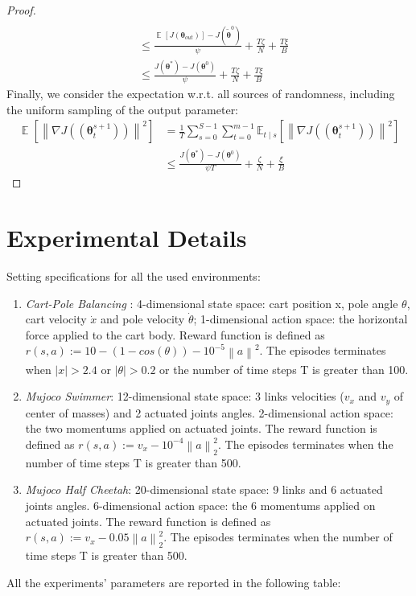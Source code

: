 \documentclass{article}
\makeatletter
\theoremstyle{remark}
\theoremstyle{definition}
\DeclareRobustCommand{\wrt}{w.r.t.\@\xspace}
\DeclareMathOperator*{\EV}{\mathbb{E}}
\newcommand{\EVV}[2][\ppvect \in \ppspace]{\EV_{#1}\left[{#2}\right]}
\newcommand{\norm}[2][\infty]{\left\|#2\right\|_{#1}}
\newcommand{\vtheta}{\boldsymbol{\theta}}
\newcommand{\gradJ}[1]{\nabla J(#1)}
\newcommand{\Ets}[2][t]{\mathbb{E}_{#1\mid s}\left[#2\right]}
\makeatother
\begin{document}
\begin{proof}
\begin{align}
 \\
 &\leq
 \frac{\EVV[]{J(\vtheta_{out})} - J(\tilde{\vtheta}^{0})}{\psi} + \frac{T\zeta}{N} + \frac{T\xi}{B} \\
 &\leq
 \frac{J(\vtheta^*) - J(\vtheta^0)}{\psi} + \frac{T\zeta}{N} + \frac{T\xi}{B}
\end{align}
Finally, we consider the expectation \wrt all sources of randomness, including the uniform sampling of the output parameter:
\begin{align}
\EVV[]{\norm[]{\gradJ{(\vtheta_t^{s+1})}}^2} 
&=\frac{1}{T}\sum_{s=0}^{S-1}\sum_{t=0}^{m-1}\Ets{\norm[]{\gradJ{(\vtheta_t^{s+1})}}^2} \\
&\leq
\frac{J(\vtheta^*) - J(\vtheta^0)}{\psi T} + \frac{\zeta}{N} + \frac{\xi}{B}
\end{align}
\end{proof}

\section{Experimental Details}\label{app:proofs}
Setting specifications for all the used environments:
\begin{enumerate}
	\item \emph{Cart-Pole Balancing} : 4-dimensional state space: cart position x, pole angle $\theta$, cart velocity $\dot{x}$ and pole velocity $\dot{\theta}$; 1-dimensional action space: the horizontal force applied to the cart body. Reward function  is defined as $r(s, a) := 10 - (1 - cos(\theta)) - 10^{-5}\norm[] a^2$. The episodes terminates when $|x|>2.4$ or $|\theta|>0.2$ or the number of time steps T is greater than 100.
	\item \emph{Mujoco Swimmer}: 12-dimensional state space: 3 links velocities ($v_x$ and $v_y$ of center of masses) and 2 actuated joints angles. 2-dimensional action space: the two momentums applied on actuated joints.  The reward function is defined as $r(s, a) := v_x - 10^{-4}\norm[2] a^2$. The episodes terminates when the number of time steps T is greater than 500.
	\item \emph{Mujoco Half Cheetah}: 20-dimensional state space: 9 links and 6 actuated joints angles. 6-dimensional action space: the 6 momentums applied on actuated joints.  The reward function is defined as $r(s, a) := v_x - 0.05\norm[2] a^2$. The episodes terminates when the number of time steps T is greater than 500.
\end{enumerate}

All the experiments' parameters are reported in the following table:
\end{document}
